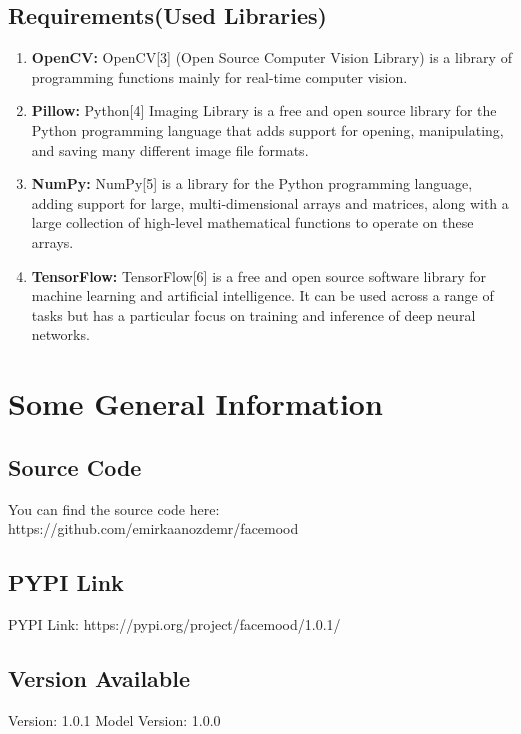 \documentclass{article}
\begin{document}
\subsection{Requirements(Used Libraries)}
\begin{enumerate}
    \item \textbf{OpenCV:} OpenCV[3] (Open Source Computer Vision Library) is a library of programming functions mainly for real-time computer vision.
    \item \textbf{Pillow:} Python[4] Imaging Library is a free and open source library for the Python programming language that adds support for opening, manipulating, and saving many different image file formats.
    \item \textbf{NumPy:} NumPy[5] is a library for the Python programming language, adding support for large, multi-dimensional arrays and matrices, along with a large collection of high-level mathematical functions to operate on these arrays.
    \item \textbf{TensorFlow:} TensorFlow[6] is a free and open source software library for machine learning and artificial intelligence. It can be used across a range of tasks but has a particular focus on training and inference of deep neural networks.
\end{enumerate}

\vspace{4cm}

\section{Some General Information}
\subsection{Source Code}
You can find the source code here: https://github.com/emirkaanozdemr/facemood
\subsection{PYPI Link}
PYPI Link:
https://pypi.org/project/facemood/1.0.1/
\subsection{Version Available}
Version: 1.0.1
Model Version: 1.0.0

\vspace{7cm}
\end{document}
